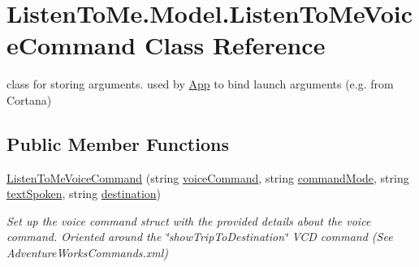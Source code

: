 \hypertarget{class_listen_to_me_1_1_model_1_1_listen_to_me_voice_command}{}\section{Listen\+To\+Me.\+Model.\+Listen\+To\+Me\+Voice\+Command Class Reference}
\label{class_listen_to_me_1_1_model_1_1_listen_to_me_voice_command}


class for storing arguments. used by \mbox{\hyperlink{class_listen_to_me_1_1_app}{App}} to bind launch arguments (e.\+g. from Cortana)  


\subsection*{Public Member Functions}
\begin{DoxyCompactItemize}
\item 
\mbox{\hyperlink{class_listen_to_me_1_1_model_1_1_listen_to_me_voice_command_a3da9ccddfb33c7b23eb9ae0ca4c9b39c}{Listen\+To\+Me\+Voice\+Command}} (string \mbox{\hyperlink{class_listen_to_me_1_1_model_1_1_listen_to_me_voice_command_ac1ab4ff605dddd6dfe7f038e46cf522e}{voice\+Command}}, string \mbox{\hyperlink{class_listen_to_me_1_1_model_1_1_listen_to_me_voice_command_a6243f032e7b44a3de833ae4362150b53}{command\+Mode}}, string \mbox{\hyperlink{class_listen_to_me_1_1_model_1_1_listen_to_me_voice_command_af82e41e09f7b7888d1ce9f6a0fa9ada8}{text\+Spoken}}, string \mbox{\hyperlink{class_listen_to_me_1_1_model_1_1_listen_to_me_voice_command_a2d2a8120188ed1a16fefbb2461ab20f2}{destination}})
\begin{DoxyCompactList}\small\item\em Set up the voice command struct with the provided details about the voice command. Oriented around the \char`\"{}show\+Trip\+To\+Destination\char`\"{} V\+CD command (See Adventure\+Works\+Commands.\+xml) \end{DoxyCompactList}\end{DoxyCompactItemize}

